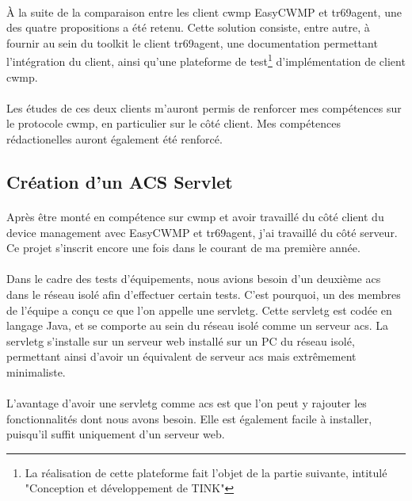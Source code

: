 \documentclass[12pt,a4paper]{report}
\begin{document}
\paragraph*{}À la suite de la comparaison entre les client \gls{cwmp} EasyCWMP et tr69agent, une des quatre propositions a été retenu. Cette solution consiste, entre autre, à fournir au sein du toolkit le client tr69agent, une documentation permettant l'intégration du client, ainsi qu'une plateforme de test\footnote{La réalisation de cette plateforme fait l'objet de la partie suivante, intitulé "Conception et développement de TINK"} d'implémentation de client \gls{cwmp}. 
\paragraph*{}Les études de ces deux clients m'auront permis de renforcer mes compétences sur le protocole \gls{cwmp}, en particulier sur le côté client. Mes compétences rédactionelles auront également été renforcé. \\
\subsection{Création d'un ACS Servlet}
\paragraph*{}Après être monté en compétence sur \gls{cwmp} et avoir travaillé du côté client du device management avec EasyCWMP et tr69agent, j’ai travaillé du côté serveur. Ce projet s'inscrit encore une fois dans le courant de ma première année.
\paragraph*{}Dans le cadre des tests d'équipements, nous avions besoin d’un deuxième \gls{acs} dans le réseau isolé afin d’effectuer certain tests. C’est pourquoi, un des membres de l’équipe a conçu ce que l’on appelle une \gls{servletg}. Cette \gls{servletg} est codée en langage Java, et se comporte au sein du réseau isolé comme un serveur \gls{acs}. La \gls{servletg} s’installe sur un serveur web installé sur un PC du réseau isolé, permettant ainsi d’avoir un équivalent de serveur \gls{acs} mais extrêmement minimaliste.
\paragraph*{}L’avantage d’avoir une \gls{servletg} comme \gls{acs} est que l’on peut y rajouter les fonctionnalités dont nous avons besoin. Elle est également facile à installer, puisqu’il suffit uniquement d’un serveur web.
\end{document}

